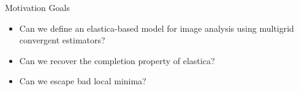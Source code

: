 \begin{frame}
{\begin{figure}
	\end{figure}	
	}	
	
	
	
	
\end{frame}

\begin{frame}
{Motivation}
{Goals}

\begin{itemize}
\item{Can we define an elastica-based model for image analysis using multigrid convergent estimators? } \pause
\item{Can we recover the completion property of elastica? } \pause
\item{Can we escape bad local minima? }
\end{itemize}

\end{frame}